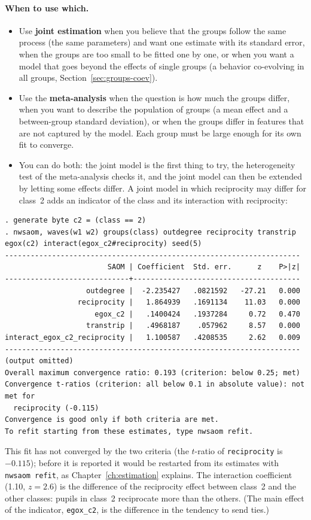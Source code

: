 \paragraph{When to use which.}
\begin{itemize}[nosep]
  \item Use \textbf{joint estimation} when you believe that the groups follow the same process (the same parameters) and want one estimate with its standard error, when the groups are too small to be fitted one by one, or when you want a model that goes beyond the effects of single groups (a behavior co-evolving in all groups, Section~\ref{sec:groups-coev}).
  \item Use the \textbf{meta-analysis} when the question is how much the groups differ, when you want to describe the population of groups (a mean effect and a between-group standard deviation), or when the groups differ in features that are not captured by the model. Each group must be large enough for its own fit to converge.
  \item You can do both: the joint model is the first thing to try, the heterogeneity test of the meta-analysis checks it, and the joint model can then be extended by letting some effects differ. A joint model in which reciprocity may differ for class~2 adds an indicator of the class and its interaction with reciprocity:
\end{itemize}
\begin{lstlisting}[basicstyle=\ttfamily\footnotesize]
. generate byte c2 = (class == 2)
. nwsaom, waves(w1 w2) groups(class) outdegree reciprocity transtrip egox(c2) interact(egox_c2#reciprocity) seed(5)
---------------------------------------------------------------------
                        SAOM | Coefficient  Std. err.      z    P>|z|
-----------------------------+---------------------------------------
                   outdegree |  -2.235427   .0821592   -27.21   0.000
                 reciprocity |   1.864939   .1691134    11.03   0.000
                     egox_c2 |   .1400424   .1937284     0.72   0.470
                   transtrip |   .4968187    .057962     8.57   0.000
interact_egox_c2_reciprocity |   1.100587   .4208535     2.62   0.009
---------------------------------------------------------------------
(output omitted)
Overall maximum convergence ratio: 0.193 (criterion: below 0.25; met)
Convergence t-ratios (criterion: all below 0.1 in absolute value): not met for
  reciprocity (-0.115)
Convergence is good only if both criteria are met.
To refit starting from these estimates, type nwsaom refit.
\end{lstlisting}
This fit has not converged by the two criteria (the $t$-ratio of \texttt{reciprocity} is $-0.115$); before it is reported it would be restarted from its estimates with \texttt{nwsaom refit}, as Chapter~\ref{ch:estimation} explains. The interaction coefficient (1.10, $z=2.6$) is the difference of the reciprocity effect between class~2 and the other classes: pupils in class~2 reciprocate more than the others. (The main effect of the indicator, \texttt{egox\_c2}, is the difference in the tendency to send ties.)

